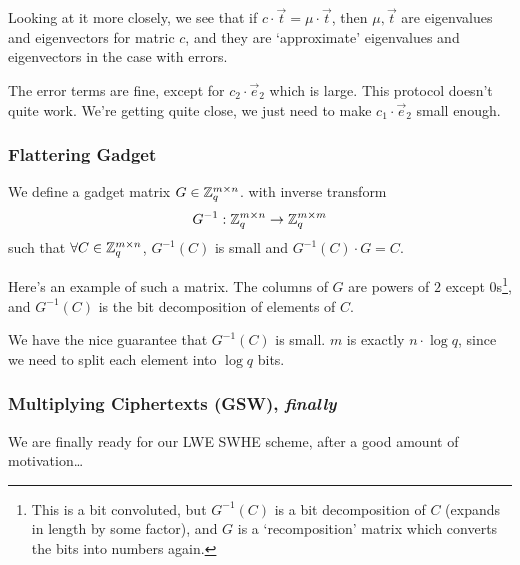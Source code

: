 Looking at it more closely, we see that if $c\cdot \vec{t} = \mu\cdot \vec{t}$, then $\mu,\vec{t}$ are eigenvalues and eigenvectors for matric $c$, and they are `approximate' eigenvalues and eigenvectors in the case with errors.

The error terms are fine, except for $c_2\cdot \vec{e}_2$ which is large. This protocol doesn't quite work. We're getting quite close, we just need to make $c_1\cdot \vec{e}_2$ small enough.

\subsubsection{Flattering Gadget}
We define a gadget matrix $G\in \mathbb Z_q^{m\times n}$.
with inverse transform
\[G^{-1} : \mathbb Z_q^{m\times n}\to \mathbb Z_q^{m\times m}\]
such that $\forall C\in \mathbb Z_q^{m\times n}$, $G^{-1}(C)$ is small and $G^{-1}(C)\cdot G = C$.

Here's an example of such a matrix. The columns of $G$ are powers of $2$ except $0$s\footnote{This is a bit convoluted, but $G^{-1}(C)$ is a bit decomposition of $C$ (expands in length by some factor), and $G$ is a `recomposition' matrix which converts the bits into numbers again.}, and $G^{-1}(C)$ is the bit decomposition of elements of $C$.

We have the nice guarantee that $G^{-1}(C)$ is small. $m$ is exactly $n\cdot \log q$, since we need to split each element into $\log q$ bits.

\subsubsection{Multiplying Ciphertexts (GSW), \emph{finally}}\label{sec:apr11-lwe_swhe}
We are finally ready for our LWE SWHE scheme, after a good amount of motivation\dots

